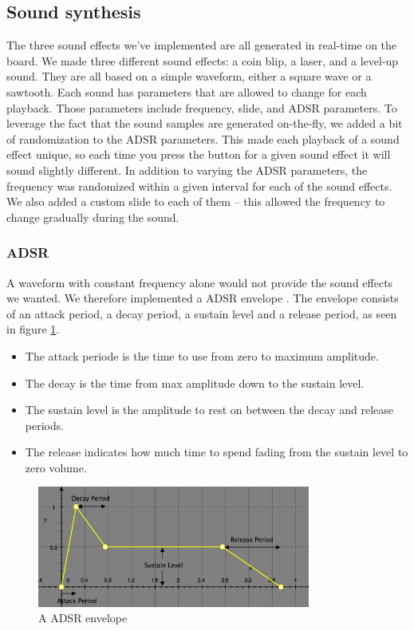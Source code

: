 \subsection{Sound synthesis}
The three sound effects we've implemented are all generated in real-time on the board.
We made three different sound effects: a coin blip, a laser, and a level-up sound.
They are all based on a simple waveform, either a square wave or a sawtooth.
Each sound has parameters that are allowed to change for each playback.
Those parameters include frequency, slide, and ADSR parameters.
To leverage the fact that the sound samples are generated on-the-fly, we added a bit of randomization to the ADSR parameters.
This made each playback of a sound effect unique, so each time you press the button for a given sound effect it will sound slightly different.
In addition to varying the ADSR parameters, the frequency was randomized within a given interval for each of the sound effects.
We also added a custom slide to each of them – this allowed the frequency to change gradually during the sound.

\subsubsection{ADSR}

A waveform with constant frequency alone would not provide the sound effects we wanted. We therefore implemented a ADSR envelope \cite{adsr}.
The envelope consists of an attack period, a decay period, a sustain level and a release period, as seen in figure \ref{fig:adsr_envelope}.

\begin{itemize}
    \item The attack periode is the time to use from zero to maximum amplitude.
    \item The decay is the time from max amplitude down to the sustain level.
    \item The sustain level is the amplitude to rest on between the decay and release periods.
    \item The release indicates how much time to spend fading from the sustain level to zero volume.
\end{itemize}

\begin{figure}[ht!]
    \begin{center}
    \includegraphics[width=0.8\textwidth]{assets/img/adsr.png}
    \caption{A ADSR envelope}
    \label{fig:adsr_envelope}
    \end{center}
\end{figure}


